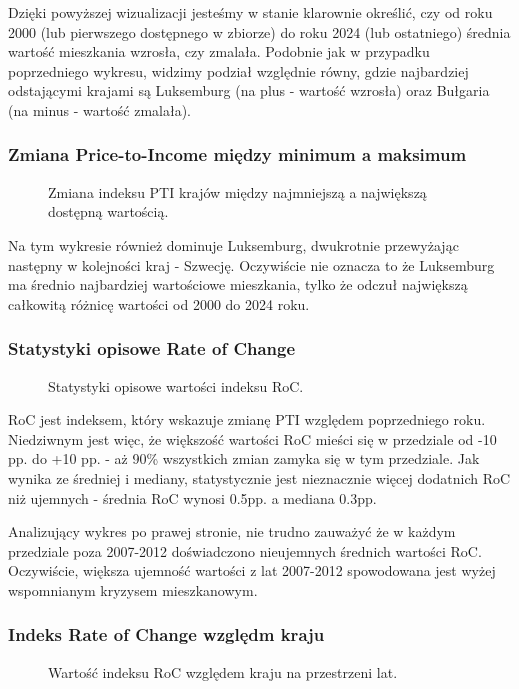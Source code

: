 \documentclass[12pt]{article}
\begin{document}
Dzięki powyższej wizualizacji jesteśmy w stanie klarownie określić, czy od roku 2000 (lub pierwszego dostępnego w zbiorze) do roku 2024 (lub ostatniego) 
średnia wartość mieszkania wzrosła, czy zmalała. Podobnie jak w przypadku poprzedniego wykresu, widzimy podział względnie równy, gdzie najbardziej odstającymi
krajami są Luksemburg (na plus - wartość wzrosła) oraz Bułgaria (na minus - wartość zmalała).

\subsubsection{Zmiana Price-to-Income między minimum a maksimum}
\begin{figure}[H]
    
    \caption{Zmiana indeksu PTI krajów między najmniejszą a największą dostępną wartością.}
\end{figure}

Na tym wykresie również dominuje Luksemburg, dwukrotnie przewyżając następny w kolejności kraj - Szwecję. Oczywiście nie oznacza to że Luksemburg ma 
średnio najbardziej wartościowe mieszkania, tylko że odczuł największą całkowitą różnicę wartości od 2000 do 2024 roku.

\subsubsection{Statystyki opisowe Rate of Change}
\begin{figure}[H]
    
    \caption{Statystyki opisowe wartości indeksu RoC.}
\end{figure}

RoC jest indeksem, który wskazuje zmianę PTI względem poprzedniego roku. Niedziwnym jest więc, że większość wartości RoC mieści się w przedziale od -10 pp.
do +10 pp. - aż 90\% wszystkich zmian zamyka się w tym przedziale. Jak wynika ze średniej i mediany, statystycznie jest nieznacznie więcej dodatnich RoC 
niż ujemnych - średnia RoC wynosi 0.5pp. a mediana 0.3pp. 

Analizujący wykres po prawej stronie, nie trudno zauważyć że w każdym przedziale poza 2007-2012 doświadczono nieujemnych średnich wartości RoC. 
Oczywiście, większa ujemność wartości z lat 2007-2012 spowodowana jest wyżej wspomnianym kryzysem mieszkanowym. 


\subsubsection{Indeks Rate of Change względm kraju}
\begin{figure}[H]
    
    \caption{Wartość indeksu RoC względem kraju na przestrzeni lat.}
    \label{wykres:1_8}
\end{figure}
\end{document}
